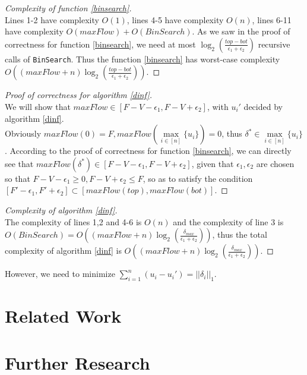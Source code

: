 \documentclass[11pt]{article}
\theoremstyle{definition}
\theoremstyle{corollary}
\theoremstyle{lemma}
\begin{document}
    \begin{proof}[Complexity of function \ref{binsearch}] \ \\
       Lines 1-2 have complexity $O(1)$, lines 4-5 have complexity $O(n)$, lines 6-11 have complexity
       $O(maxFlow) + O(BinSearch)$. As we saw in the proof of correctness for function \ref{binsearch}, we need at most
       $\log_2(\frac{top - bot}{\epsilon_1 + \epsilon_2})$ recursive calls of \texttt{BinSearch}. Thus the function
       \ref{binsearch} has worst-case complexity $O((maxFlow + n)\log_2(\frac{top - bot}{\epsilon_1 + \epsilon_2}))$.
    \end{proof}
    \begin{proof}[Proof of correctness for algorithm \ref{dinf}] \ \\
       We will show that $maxFlow \in [F - V - \epsilon_1, F - V + \epsilon_2]$, with $u_i'$ decided by algorithm
       \ref{dinf}. \\
       Obviously $maxFlow(0) = F, maxFlow(\max\limits_{i \in [n]}\{u_i\}) = 0$, thus $\delta^* \in
       \max\limits_{i \in [n]}\{u_i\}$. According to the proof of correctness for function \ref{binsearch},
       we can directly see that $maxFlow(\delta^*) \in [F - V - \epsilon_1, F - V + \epsilon_2]$, given that
       $\epsilon_1, \epsilon_2$ are chosen so that $F - V - \epsilon_1 \geq 0, F - V + \epsilon_2 \leq F$, so as to satisfy
       the condition $[F' - \epsilon_1, F' + \epsilon_2] \subset [maxFlow(top),maxFlow(bot)]$.
    \end{proof}
    \begin{proof}[Complexity of algorithm \ref{dinf}] \ \\
       The complexity of lines 1,2 and 4-6 is $O(n)$ and the complexity of line 3 is $O(BinSearch) = O((maxFlow + n)
       \log_2(\frac{\delta_{max}}{\epsilon_1 + \epsilon_2}))$, thus the total complexity of algorithm \ref{dinf} is
       $O((maxFlow + n)\log_2(\frac{\delta_{max}}{\epsilon_1 + \epsilon_2}))$.
    \end{proof}    
    However, we need to minimize $\sum\limits_{i=1}^{n}(u_i-u_i') = ||\delta_i||_1$.

  \section{Related Work}

  \section{Further Research}
\end{document}
